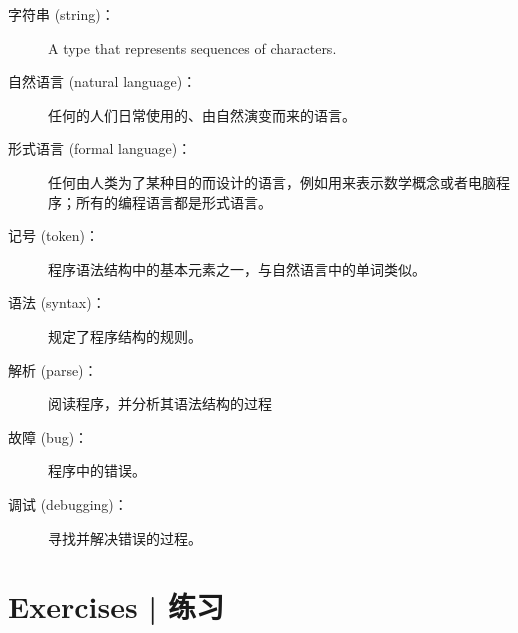 \begin{description}
\item[字符串 (string)：] A type that represents sequences of characters.
  

\item[自然语言 (natural language)：]  任何的人们日常使用的、由自然演变而来的语言。
  

\item[形式语言 (formal language)：]  任何由人类为了某种目的而设计的语言，例如用来表示数学概念或者电脑程序；所有的编程语言都是形式语言。
  

\item[记号 (token)：]  程序语法结构中的基本元素之一，与自然语言中的单词类似。
  

\item[语法 (syntax)：] 规定了程序结构的规则。
  

\item[解析 (parse)：] 阅读程序，并分析其语法结构的过程

\item[故障 (bug)：] 程序中的错误。

\item[调试 (debugging)：] 寻找并解决错误的过程。
  

\end{description}

\section{Exercises  |  练习}

